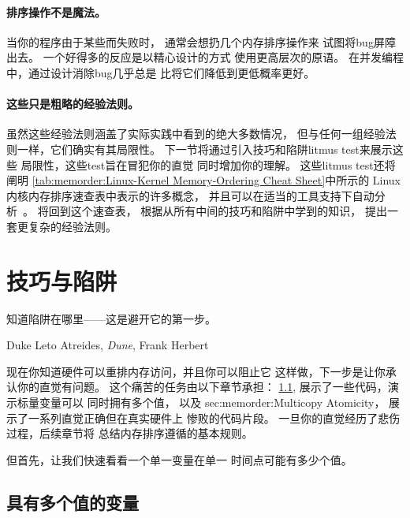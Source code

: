 \paragraph{排序操作不是魔法。}
当你的程序由于某些而失败时，
通常会想扔几个内存排序操作来
试图将bug屏障出去。
一个好得多的反应是以精心设计的方式
使用更高层次的原语。
在并发编程中，通过设计消除bug几乎总是
比将它们降低到更低概率更好。

\paragraph{这些只是粗略的经验法则。}
虽然这些经验法则涵盖了实际实践中看到的绝大多数情况，
但与任何一组经验法则一样，它们确实有其局限性。
下一节将通过引入技巧和陷阱litmus test来展示这些
局限性，这些test旨在冒犯你的直觉
同时增加你的理解。
这些litmus test还将阐明
\cref{tab:memorder:Linux-Kernel Memory-Ordering Cheat Sheet}中所示的
Linux内核内存排序速查表中表示的许多概念，
并且可以在适当的工具支持下自动分析~\cite{Alglave:2018:FSC:3173162.3177156}。
将回到这个速查表，
根据从所有中间的技巧和陷阱中学到的知识，
提出一套更复杂的经验法则。

\QuickQuizEnd

\section{技巧与陷阱}
\label{sec:memorder:Tricks and Traps}
%
\epigraph{知道陷阱在哪里------这是避开它的第一步。}
	 {Duke Leto Atreides, \emph{Dune}, Frank Herbert}

现在你知道硬件可以重排内存访问，并且你可以阻止它
这样做，下一步是让你承认你的直觉有问题。
这个痛苦的任务由以下章节承担：
\cref{sec:memorder:Variables With Multiple Values},
展示了一些代码，演示标量变量可以
同时拥有多个值，
以及
{sec:memorder:Multicopy Atomicity}，
展示了一系列直觉正确但在真实硬件上
惨败的代码片段。
一旦你的直觉经历了悲伤过程，后续章节将
总结内存排序遵循的基本规则。

但首先，让我们快速看看一个单一变量在单一
时间点可能有多少个值。

\subsection{具有多个值的变量}
\label{sec:memorder:Variables With Multiple Values}

